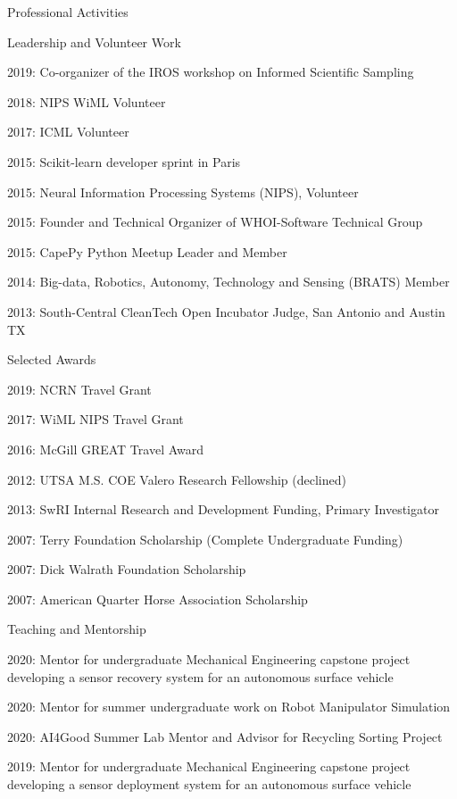 \documentclass{resume} %
\begin{document}
\begin{rSection}{Professional Activities}
\begin{rSubsection}{Leadership and Volunteer Work}{}{}{}
\item{2019: Co-organizer of the IROS workshop on Informed Scientific Sampling}
\item{2018: NIPS WiML Volunteer}
\item{2017: ICML Volunteer}
\item{2015: Scikit-learn developer sprint in Paris}
\item{2015: Neural Information Processing Systems (NIPS), Volunteer}
\item{2015: Founder and Technical Organizer of WHOI-Software Technical Group}
\item{2015: CapePy Python Meetup Leader and Member}
\item{2014: Big-data, Robotics, Autonomy, Technology and Sensing (BRATS) Member}
\item{2013: South-Central CleanTech Open Incubator Judge, San Antonio and Austin TX}
\end{rSubsection}
\vspace{-.2cm}
\begin{rSubsection}{Selected Awards}{}{}{}
\item{2019: NCRN Travel Grant}
\item{2017: WiML NIPS Travel Grant} 
\item{2016: McGill GREAT Travel Award} 
\item{2012: UTSA M.S. COE Valero Research Fellowship (declined)}
\item{2013: SwRI Internal Research and Development Funding, Primary Investigator} 
\item{2007: Terry Foundation Scholarship (Complete Undergraduate Funding)} 
\item{2007: Dick Walrath Foundation Scholarship} 
\item{2007: American Quarter Horse Association Scholarship} 
\end{rSubsection}
\vspace{-.2cm}
\begin{rSubsection}{Teaching and Mentorship}{}{}{}
\item{2020: Mentor for undergraduate Mechanical Engineering capstone project developing a sensor recovery system for an autonomous surface vehicle}
\item{2020: Mentor for summer undergraduate work on Robot Manipulator Simulation}
\item{2020: AI4Good Summer Lab Mentor and Advisor for Recycling Sorting Project}
\item{2019: Mentor for undergraduate Mechanical Engineering capstone project developing a sensor deployment system for an autonomous surface vehicle}

\end{rSubsection}
\end{rSection}
\end{document}
